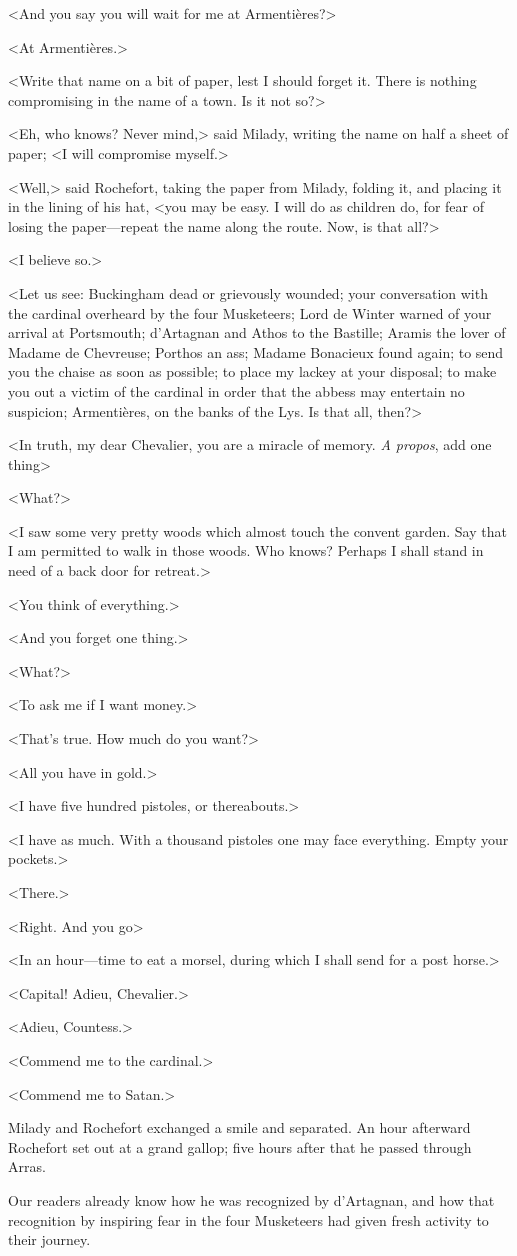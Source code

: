 <And you say you will wait for me at Armentières?> 

<At Armentières.> 

<Write that name on a bit of paper, lest I should forget it. There is nothing compromising in the name of a town. Is it not so?> 

<Eh, who knows? Never mind,> said Milady, writing the name on half a sheet of paper; <I will compromise myself.> 

<Well,> said Rochefort, taking the paper from Milady, folding it, and placing it in the lining of his hat, <you may be easy. I will do as children do, for fear of losing the paper---repeat the name along the route. Now, is that all?> 

<I believe so.> 

<Let us see: Buckingham dead or grievously wounded; your conversation with the cardinal overheard by the four Musketeers; Lord de Winter warned of your arrival at Portsmouth; d'Artagnan and Athos to the Bastille; Aramis the lover of Madame de Chevreuse; Porthos an ass; Madame Bonacieux found again; to send you the chaise as soon as possible; to place my lackey at your disposal; to make you out a victim of the cardinal in order that the abbess may entertain no suspicion; Armentières, on the banks of the Lys. Is that all, then?> 

<In truth, my dear Chevalier, you are a miracle of memory. \textit{A propos}, add one thing\longdash> 

<What?> 

<I saw some very pretty woods which almost touch the convent garden. Say that I am permitted to walk in those woods. Who knows? Perhaps I shall stand in need of a back door for retreat.> 

<You think of everything.> 

<And you forget one thing.> 

<What?> 

<To ask me if I want money.> 

<That's true. How much do you want?> 

<All you have in gold.> 

<I have five hundred pistoles, or thereabouts.> 

<I have as much. With a thousand pistoles one may face everything. Empty your pockets.> 

<There.> 

<Right. And you go\longdash> 

<In an hour---time to eat a morsel, during which I shall send for a post horse.> 

<Capital! Adieu, Chevalier.> 

<Adieu, Countess.> 

<Commend me to the cardinal.> 

<Commend me to Satan.> 

Milady and Rochefort exchanged a smile and separated. An hour afterward Rochefort set out at a grand gallop; five hours after that he passed through Arras. 

Our readers already know how he was recognized by d'Artagnan, and how that recognition by inspiring fear in the four Musketeers had given fresh activity to their journey.